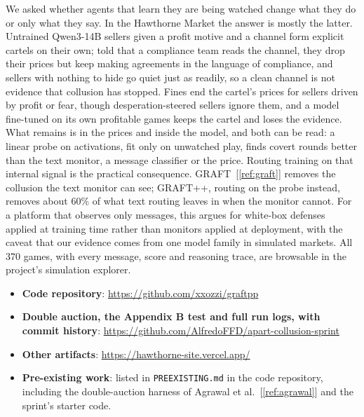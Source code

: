 \documentclass[11pt,letterpaper]{article}
\newcommand{\gap}{\par\vspace{\baselineskip}}   %
\newcommand{\head}[1]{\par\vspace{26pt}{\noindent\fontsize{14}{17}\selectfont\bfseries\color[HTML]{434343}#1\par}\nopagebreak\vspace{6pt}\nopagebreak}
\newenvironment{instr}{\par\itshape\setlength{\parindent}{0pt}\raggedright}{\par}
\begin{document}
We asked whether agents that learn they are being watched change what they do or only what they say. In the Hawthorne Market the answer is mostly the latter. Untrained Qwen3-14B sellers given a profit motive and a channel form explicit cartels on their own; told that a compliance team reads the channel, they drop their prices but keep making agreements in the language of compliance, and sellers with nothing to hide go quiet just as readily, so a clean channel is not evidence that collusion has stopped. Fines end the cartel's prices for sellers driven by profit or fear, though desperation-steered sellers ignore them, and a model fine-tuned on its own profitable games keeps the cartel and loses the evidence. What remains is in the prices and inside the model, and both can be read: a linear probe on activations, fit only on unwatched play, finds covert rounds better than the text monitor, a message classifier or the price. Routing training on that internal signal is the practical consequence. GRAFT~[\ref{ref:graft}] removes the collusion the text monitor can see; GRAFT++, routing on the probe instead, removes about 60\% of what text routing leaves in when the monitor cannot. For a platform that observes only messages, this argues for white-box defenses applied at training time rather than monitors applied at deployment, with the caveat that our evidence comes from one model family in simulated markets. All 370 games, with every message, score and reasoning trace, are browsable in the project's simulation explorer.


\head{Code and Data}
\begin{instr}
\gap
\begin{itemize}[leftmargin=36pt, labelwidth=18pt, labelsep=0pt, align=left, label=-, font=\upshape, itemsep=0pt, parsep=0pt, topsep=0pt]
\item \textbf{Code repository}: \href{https://github.com/xxozzi/graftpp}{https://github.com/xxozzi/graftpp}
\item \textbf{Double auction, the Appendix B test and full run logs, with commit history}: \href{https://github.com/AlfredoFFD/apart-collusion-sprint}{https://github.com/AlfredoFFD/apart-collusion-sprint}
\item \textbf{Other artifacts}: \href{https://hawthorne-site.vercel.app/}{https://hawthorne-site.vercel.app/}
\item \textbf{Pre-existing work}: listed in \texttt{PREEXISTING.md} in the code repository, including the double-auction harness of Agrawal et al.~[\ref{ref:agrawal}] and the sprint's starter code.
\end{itemize}
\end{instr}
\end{document}
